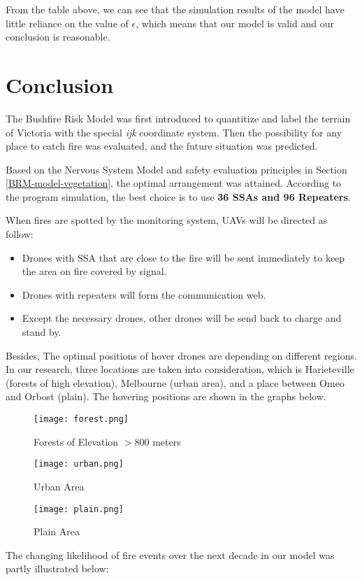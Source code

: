 \documentclass[13pt]{ctexart} %
\begin{document}
From the table above, we can see that the simulation results of the model have little reliance on the value of $\epsilon$, which means that our model is valid and our conclusion is reasonable.

\section{Conclusion}
The Bushfire Risk Model was first introduced to quantitize and label the terrain of Victoria with the special \textit{ijk} coordinate system. Then the possibility for any place to catch fire was evaluated, and the future situation was predicted.

Based on the Nervous System Model and safety evaluation principles in Section \ref{BRM-model-vegetation}, the optimal arrangement was attained. According to the program simulation, the best choice is to use \textbf{36 SSAs and 96 Repeaters}.

When fires are spotted by the monitoring system, UAVs will be directed as follow:
\begin{itemize}
    \item Drones with SSA that are close to the fire will be sent immediately to keep the area on fire covered by signal.
    \item Drones with repeaters will form the communication web.
    \item Except the necessary drones, other drones will be send back to charge and stand by.
\end{itemize}

Besides, The optimal positions of hover drones are depending on different regions. In our research, three locations are taken into consideration, which is Harieteville (forests of high elevation), Melbourne (urban area), and a place between Omeo and Orbost (plain). The hovering positions are shown in the graphs below.
\begin {figure}[h]
\centering %
\texttt{[image: forest.png]}
\caption{Forests of Elevation $> 800$ meters} %
\end {figure}

\begin {figure}[h]
\centering %
\texttt{[image: urban.png]}
\caption{Urban Area} %
\end {figure}

\begin {figure}[h]
\centering %
\texttt{[image: plain.png]}
\caption{Plain Area} %
\end {figure}
\clearpage
The changing likelihood of fire events over the next decade in our model was partly illustrated below:
\end{document}
